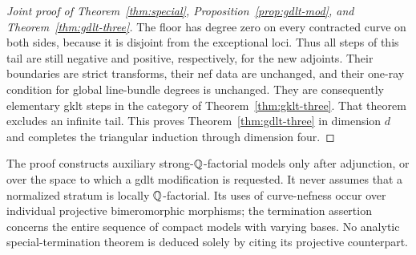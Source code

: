 \begin{proof}[Joint proof of Theorem~\ref{thm:special},
Proposition~\ref{prop:gdlt-mod}, and Theorem~\ref{thm:gdlt-three}]
The floor has degree zero on every contracted curve
on both sides, because it is disjoint from the
exceptional loci.  Thus all steps of this tail are
still negative and positive, respectively, for the
new adjoints.  Their boundaries are strict transforms,
their nef data are unchanged, and their one-ray
condition for global line-bundle degrees is
unchanged.  They are consequently elementary gklt
steps in the category of
Theorem~\ref{thm:gklt-three}.  That theorem excludes
an infinite tail.  This proves
Theorem~\ref{thm:gdlt-three} in dimension $d$ and
completes the triangular induction through
dimension four.
\end{proof}

\begin{remark}
The proof constructs auxiliary strong-$\mathbb Q$-factorial
models only after adjunction, or over the space to
which a gdlt modification is requested.  It never
assumes that a normalized stratum is locally
$\mathbb Q$-factorial.  Its uses of curve-nefness occur over
individual projective bimeromorphic morphisms;
the termination assertion concerns the entire
sequence of compact models with varying bases.
No analytic special-termination theorem is deduced
solely by citing its projective counterpart.
\end{remark}
